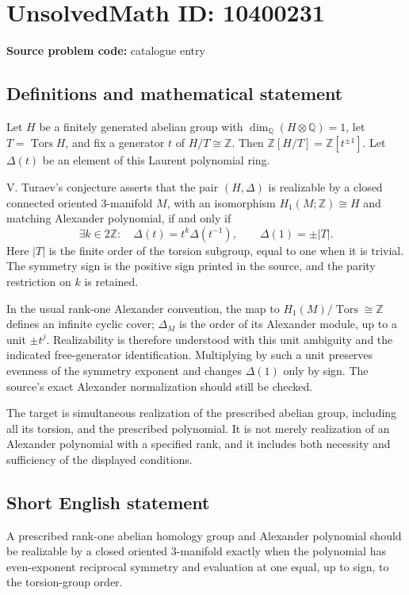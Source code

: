 \documentclass[11pt]{article}
\newcommand{\Z}{\mathbb{Z}}
\newcommand{\Q}{\mathbb{Q}}
\begin{document}
\section*{UnsolvedMath ID: 10400231}
\textbf{Source problem code:} catalogue entry
\subsection{Definitions and mathematical statement}
Let \(H\) be a finitely generated abelian group with \(\dim_\Q(H\otimes\Q)=1\), let \(T=\operatorname{Tors}H\), and fix a generator \(t\) of \(H/T\cong\Z\). Then \(\Z[H/T]=\Z[t^{\pm1}]\). Let \(\Delta(t)\) be an element of this Laurent polynomial ring.

V. Turaev's conjecture asserts that the pair \((H,\Delta)\) is realizable by a closed connected oriented 3-manifold \(M\), with an isomorphism \(H_1(M;\Z)\cong H\) and matching Alexander polynomial, if and only if
\[
 \exists k\in2\Z:\quad\Delta(t)=t^k\Delta(t^{-1}),\qquad
 \Delta(1)=\pm|T|.
\]
Here \(|T|\) is the finite order of the torsion subgroup, equal to one when it is trivial. The symmetry sign is the positive sign printed in the source, and the parity restriction on \(k\) is retained.

In the usual rank-one Alexander convention, the map to \(H_1(M)/\operatorname{Tors}\cong\Z\) defines an infinite cyclic cover; \(\Delta_M\) is the order of its Alexander module, up to a unit \(\pm t^j\). Realizability is therefore understood with this unit ambiguity and the indicated free-generator identification. Multiplying by such a unit preserves evenness of the symmetry exponent and changes \(\Delta(1)\) only by sign. The source's exact Alexander normalization should still be checked.

The target is simultaneous realization of the prescribed abelian group, including all its torsion, and the prescribed polynomial. It is not merely realization of an Alexander polynomial with a specified rank, and it includes both necessity and sufficiency of the displayed conditions.
\subsection{Short English statement}
A prescribed rank-one abelian homology group and Alexander polynomial should be realizable by a closed oriented 3-manifold exactly when the polynomial has even-exponent reciprocal symmetry and evaluation at one equal, up to sign, to the torsion-group order.
\end{document}
